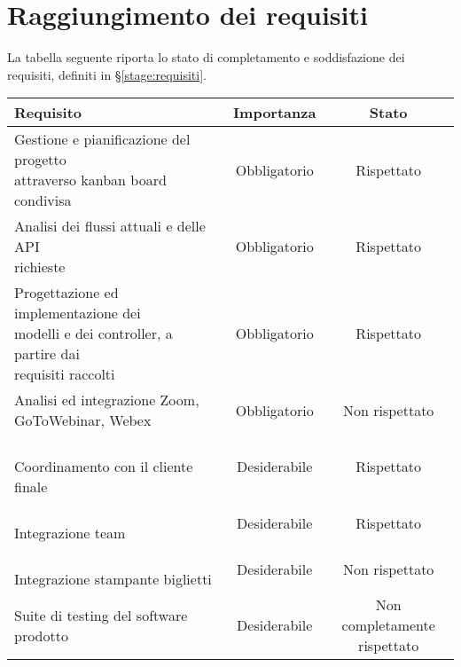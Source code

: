 \section{Raggiungimento dei requisiti}
La tabella seguente riporta lo stato di completamento e soddisfazione dei requisiti, definiti in \S \ref{stage:requisiti}.
\begin{table}[h]
	\centering
	\label{tab:raggiungimento-obiettivi}
	\begin{tabularx}{\textwidth}{X|c|c}
		\rowcolor{white}
		\textbf{Requisito} & \textbf{Importanza} & \textbf{Stato} \\
		\hline
		\makecell[l]{Gestione e pianificazione del progetto \\ attraverso kanban board condivisa} & Obbligatorio & Rispettato \\
		\makecell[l]{Analisi dei flussi attuali e delle API \\ richieste} & Obbligatorio & Rispettato \\
		\makecell[l]{Progettazione ed implementazione dei \\ modelli e dei controller, a partire dai \\ requisiti raccolti} & Obbligatorio & Rispettato \\
		\makecell[l]{Analisi ed integrazione Zoom, \\ GoToWebinar, Webex} & Obbligatorio & Non rispettato \\
		\makecell[l]{\vspace{-6pt} \\ Coordinamento con il cliente finale \\ \vspace{-6pt}} & Desiderabile & Rispettato \\
		\makecell[l]{\vspace{-6pt} \\ Integrazione team \\ \vspace{-6pt}} & Desiderabile & Rispettato \\
		\makecell[l]{\vspace{-6pt} \\ Integrazione stampante biglietti \\ \vspace{-6pt}} & Desiderabile & Non rispettato \\
		Suite di testing del software prodotto & Desiderabile & \makecell{Non completamente \\ rispettato} \\

\end{tabularx}
\end{table}
